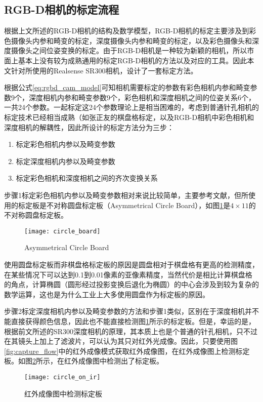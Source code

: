 \subsection{RGB-D相机的标定流程}
\label{sec:rgb-d_calibration}
根据上文所述的RGB-D相机的结构及数学模型，RGB-D相机的标定主要涉及到彩色摄像头内参和畸变的标定，深度摄像头内参和畸变的标定，以及彩色摄像头和深度摄像头之间位姿变换的标定。由于RGB-D相机是一种较为新颖的相机，所以市面上基本上没有较为成熟通用的标定RGB-D相机的方法以及对应的工具。因此本文针对所使用的Realsense SR300相机，设计了一套标定方法。

根据公式\ref{eq:rgbd_cam_model}可知相机需要标定的参数有彩色相机内参和畸变参数9个，深度相机内参和畸变参数9个，彩色相机和深度相机之间的位姿关系6个，一共24个参数。一起标定这24个参数理论上是相当困难的，考虑到普通针孔相机的标定技术已经相当成熟（如张正友的棋盘格标定\cite{Zhang2002}，以及RGB-D相机中彩色相机和深度相机的解耦性，因此所设计的标定方法分为三步：
\begin{enumerate}[Step 1]
\item 标定彩色相机内参以及畸变参数
\item 标定深度相机内参以及畸变参数
\item 标定彩色相机和深度相机之间的齐次变换关系
\end{enumerate}

步骤1标定彩色相机内参以及畸变参数相对来说比较简单，主要参考文献\cite{Zhang2002}，但所使用的标定板是不对称圆盘标定板（Asymmetrical Circle Board），如图\ref{fig:circle_board}是$4\times 11$的不对称圆盘标定板。
\begin{figure}[!ht]
  \centering
  \texttt{[image: circle\_board]}
  \caption{Asymmetrical Circle Board}
  \label{fig:circle_board}
\end{figure}
使用圆盘标定板而非棋盘格标定板的原因是圆盘相对于棋盘格有更高的检测精度，在某些情况下可以达到0.1到0.01像素的亚像素精度，当然代价是相比计算棋盘格的角点，计算椭圆（圆形经过投影变换后退化为椭圆）的中心会涉及到较为复杂的数学运算，这也是为什么工业上大多使用圆盘作为标定板的原因。

步骤2标定深度相机内参以及畸变参数的方法和步骤1类似，区别在于深度相机并不能直接获得颜色信息，因此也不能直接检测图\ref{fig:circle_board}所示的标定板。但是，幸运的是，根据前文所述的SR300深度相机的原理，其本质上也是个普通的针孔相机，只不过在其镜头上加上了滤波片，可以认为其只对红外光成像。因此，只要使用图\ref{fig:capture_flow}中的红外成像模式获取红外成像图，在红外成像图上检测标定板。如图\ref{fig:circle_on_ir}所示，在红外成像图中检测出了标定板。
\begin{figure}[!ht]
  \centering
  \texttt{[image: circle\_on\_ir]}
  \caption{红外成像图中检测标定板}
  \label{fig:circle_on_ir}
\end{figure}

